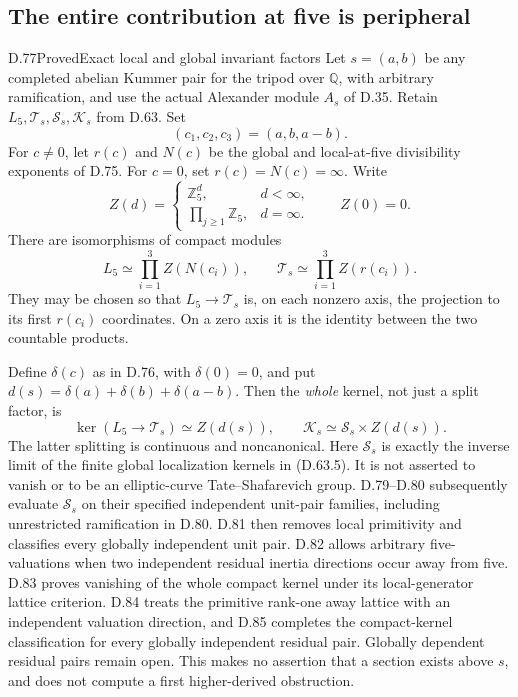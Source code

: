 \subsection{The entire contribution at five is peripheral}

\begin{statement}{D.77}{Proved}{Exact local and global invariant factors}
Let \(s=(a,b)\) be any completed abelian Kummer pair for the tripod over
\(\mathbb Q\), with arbitrary ramification, and use the actual Alexander
module \(A_s\) of D.35. Retain \(L_5,\mathcal T_s,\mathcal S_s,\mathcal K_s\)
from D.63. Set
\[
 (c_1,c_2,c_3)=(a,b,a-b).
\]
For \(c\ne0\), let \(r(c)\) and \(N(c)\) be the global and local-at-five
divisibility exponents of D.75. For \(c=0\), set \(r(c)=N(c)=\infty\).
Write
\[
 Z(d)=
 \begin{cases}
 \mathbb Z_5^d,&d<\infty,\\
 \displaystyle\prod_{j\ge1}\mathbb Z_5,&d=\infty .
 \end{cases}
 \qquad Z(0)=0.                                      \tag{D.77.1}
\]
There are isomorphisms of compact modules
\[
 L_5\simeq\prod_{i=1}^3 Z(N(c_i)),\qquad
 \mathcal T_s\simeq\prod_{i=1}^3 Z(r(c_i)).             \tag{D.77.2}
\]
They may be chosen so that \(L_5\to\mathcal T_s\) is, on each nonzero
axis, the projection to its first \(r(c_i)\) coordinates. On a zero
axis it is the identity between the two countable products.

Define \(\delta(c)\) as in D.76, with \(\delta(0)=0\), and put
\(d(s)=\delta(a)+\delta(b)+\delta(a-b)\). Then the \emph{whole} kernel, not just a split factor, is
\[
 \ker(L_5\longrightarrow\mathcal T_s)\simeq Z(d(s)),
 \qquad
 \mathcal K_s\simeq\mathcal S_s\times Z(d(s)).          \tag{D.77.3}
\]
The latter splitting is continuous and noncanonical.
Here \(\mathcal S_s\) is exactly the inverse limit of the finite
global localization kernels in (D.63.5). It is not asserted to vanish
or to be an elliptic-curve Tate--Shafarevich group.
D.79--D.80 subsequently evaluate \(\mathcal S_s\) on their
specified independent unit-pair families, including unrestricted
ramification in D.80. D.81 then removes local primitivity and
classifies every globally independent unit pair. D.82 allows
arbitrary five-valuations when two independent residual inertia
directions occur away from five. D.83 proves vanishing of the
whole compact kernel under its local-generator lattice
criterion. D.84 treats the primitive rank-one away lattice
with an independent valuation direction, and D.85 completes the
compact-kernel classification for every globally independent
residual pair. Globally dependent residual pairs remain open.
This makes no assertion that a section exists above \(s\),
and does not compute a first higher-derived obstruction.
\end{statement}

